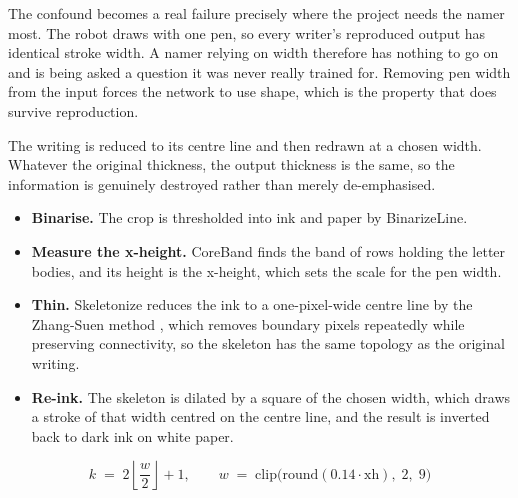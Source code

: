 The confound becomes a real failure precisely where the project needs the namer most. The robot draws with one pen, so every writer's reproduced output has identical stroke width. A namer relying on width therefore has nothing to go on and is being asked a question it was never really trained for. Removing pen width from the input forces the network to use shape, which is the property that does survive reproduction.


The writing is reduced to its centre line and then redrawn at a chosen width. Whatever the original thickness, the output thickness is the same, so the information is genuinely destroyed rather than merely de-emphasised.


\begin{itemize}\setlength\itemsep{0pt}
  \item \textbf{Binarise.} The crop is thresholded into ink and paper by BinarizeLine.
  \item \textbf{Measure the x-height.} CoreBand finds the band of rows holding the letter bodies, and its height is the x-height, which sets the scale for the pen width.
  \item \textbf{Thin.} Skeletonize reduces the ink to a one-pixel-wide centre line by the Zhang-Suen method \cite{zhangsuen1984}, which removes boundary pixels repeatedly while preserving connectivity, so the skeleton has the same topology as the original writing.
  \item \textbf{Re-ink.} The skeleton is dilated by a square of the chosen width, which draws a stroke of that width centred on the centre line, and the result is inverted back to dark ink on white paper.
\end{itemize}


\begin{equation}
k \;=\; 2\left\lfloor \frac{w}{2} \right\rfloor + 1, \qquad w \;=\; \mathrm{clip}\big(\mathrm{round}(0.14 \cdot \mathrm{xh}),\; 2,\; 9\big)
\end{equation}

